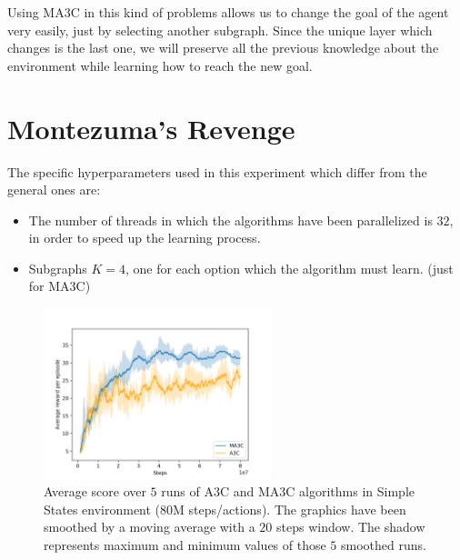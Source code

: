 Using \ac{MA3C} in this kind of problems allows us to change the goal of the agent very easily, just by selecting another
subgraph.
Since the unique layer which changes is the last one, we will preserve all the previous knowledge about the environment
while learning how to reach the new goal.


\section{Montezuma's Revenge}

The specific hyperparameters used in this experiment which differ from the general ones are:
\begin{itemize}
    \item The number of threads in which the algorithms have been parallelized is $32$, in order to speed up the learning
    process.
    \item Subgraphs $K = 4$, one for each option which the algorithm must learn. (just for \ac{MA3C})
\end{itemize}

\begin{figure}[hbtp]
\begin{center}
\includegraphics[width=250]{img/Montezuma_performance.png}
\end{center}
\caption[Montezuma's Revenge performance]
{Average score over $5$ runs of \ac{A3C} and \ac{MA3C} algorithms in Simple States environment (80M steps/actions).
The graphics have been smoothed by a moving average with a $20$ steps window.
The shadow represents maximum and minimum values of those $5$ smoothed runs.}
\label{fig:Montezuma_performance}
\end{figure}

